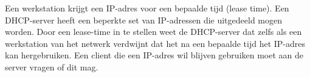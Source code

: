 Een werkstation krijgt een IP-adres voor een bepaalde tijd (lease time). Een DHCP-server heeft een beperkte set van IP-adressen die uitgedeeld mogen worden. Door een lease-time in te stellen weet de DHCP-server dat zelfs als een werkstation van het netwerk verdwijnt dat het na een bepaalde tijd het IP-adres kan hergebruiken. Een client die een IP-adres wil blijven gebruiken moet aan de server vragen of dit mag.

